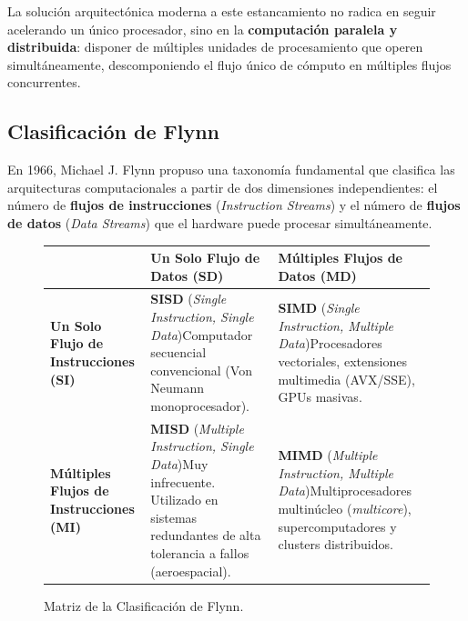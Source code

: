 La solución arquitectónica moderna a este estancamiento no radica en seguir acelerando un único procesador, sino en la \textbf{computación paralela y distribuida}: disponer de múltiples unidades de procesamiento que operen simultáneamente, descomponiendo el flujo único de cómputo en múltiples flujos concurrentes.

\subsection{Clasificación de Flynn}
En 1966, Michael J. Flynn propuso una taxonomía fundamental que clasifica las arquitecturas computacionales a partir de dos dimensiones independientes: el número de \textbf{flujos de instrucciones} (\emph{Instruction Streams}) y el número de \textbf{flujos de datos} (\emph{Data Streams}) que el hardware puede procesar simultáneamente.

\begin{figure}[htbp]
\centering
\small
\begin{tabular}{>{\raggedright\arraybackslash}p{3.0cm}>{\raggedright\arraybackslash}p{5.5cm}>{\raggedright\arraybackslash}p{5.5cm}}
\toprule
& \textbf{Un Solo Flujo de Datos (SD)} & \textbf{Múltiples Flujos de Datos (MD)} \\
\midrule
\textbf{Un Solo Flujo de Instrucciones (SI)} & \textbf{SISD} (\emph{Single Instruction, Single Data})\newline Computador secuencial convencional (Von Neumann monoprocesador). & \textbf{SIMD} (\emph{Single Instruction, Multiple Data})\newline Procesadores vectoriales, extensiones multimedia (AVX/SSE), GPUs masivas. \\
\addlinespace
\textbf{Múltiples Flujos de Instrucciones (MI)} & \textbf{MISD} (\emph{Multiple Instruction, Single Data})\newline Muy infrecuente. Utilizado en sistemas redundantes de alta tolerancia a fallos (aeroespacial). & \textbf{MIMD} (\emph{Multiple Instruction, Multiple Data})\newline Multiprocesadores multinúcleo (\emph{multicore}), supercomputadores y clusters distribuidos. \\
\bottomrule
\end{tabular}
\caption{Matriz de la Clasificación de Flynn.}
\label{tab:flynn}
\end{figure}

